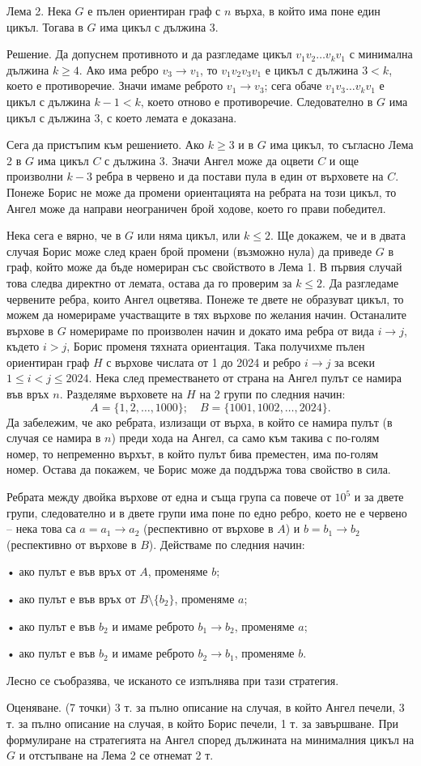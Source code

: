 Лема 2. Нека $G$ е пълен ориентиран граф с $n$ върха, в който има поне един цикъл. Тогава в $G$ има цикъл с дължина 3.

Решение. Да допуснем противното и да разгледаме цикъл $v_1v_2\ldots v_kv_1$ с минимална дължина $k\geq4$. Ако има ребро $v_3\to v_1$, то $v_1v_2v_3v_1$ е цикъл с дължина $3<k$, което е противоречие. Значи имаме реброто $v_1\to v_3$; сега обаче $v_1v_3\ldots v_kv_1$ е цикъл с дължина $k-1<k$, което отново е противоречие. Следователно в $G$ има цикъл с дължина 3, с което лемата е доказана.

Сега да пристъпим към решението. Ако $k\geq3$ и в $G$ има цикъл, то съгласно Лема 2 в $G$ има цикъл $C$ с дължина 3. Значи Ангел може да оцвети $C$ и още произволни $k-3$ ребра в червено и да постави пула в един от върховете на $C$. Понеже Борис не може да промени ориентацията на ребрата на този цикъл, то Ангел може да направи неограничен брой ходове, което го прави победител.

Нека сега е вярно, че в $G$ или няма цикъл, или $k\leq2$. Ще докажем, че и в двата случая Борис може след краен брой промени (възможно нула) да приведе $G$ в граф, който може да бъде номериран със свойството в Лема 1. В първия случай това следва директно от лемата, остава да го проверим за $k\leq2$. Да разгледаме червените ребра, които Ангел оцветява. Понеже те двете не образуват цикъл, то можем да номерираме участващите в тях върхове по желания начин. Останалите върхове в $G$ номерираме по произволен начин и докато има ребра от вида $i\to j$, където $i>j$, Борис променя тяхната ориентация. Така получихме пълен ориентиран граф $H$ с върхове числата от 1 до 2024 и ребро $i\to j$ за всеки $1\leq i<j\leq2024$. Нека след преместването от страна на Ангел пулът се намира във връх $n$. Разделяме върховете на $H$ на 2 групи по следния начин:
$$
A=\{1,2,\ldots,1000\};\quad B=\{1001,1002,\ldots,2024\}.
$$
Да забележим, че ако ребрата, излизащи от върха, в който се намира пулът (в случая се намира в $n$) преди хода на Ангел, са само към такива с по-голям номер, то непременно върхът, в който пулът бива преместен, има по-голям номер. Остава да покажем, че Борис може да поддържа това свойство в сила.

Ребрата между двойка върхове от една и съща група са повече от $10^5$ и за двете групи, следователно и в двете групи има поне по едно ребро, което не е червено – нека това са $a=a_1\to a_2$ (респективно от върхове в $A$) и $b=b_1\to b_2$ (респективно от върхове в $B$). Действаме по следния начин:

• ако пулът е във връх от $A$, променяме $b$;

• ако пулът е във връх от $B\setminus\{b_2\}$, променяме $a$;

• ако пулът е във $b_2$ и имаме реброто $b_1\to b_2$, променяме $a$;

• ако пулът е във $b_2$ и имаме реброто $b_2\to b_1$, променяме $b$.

Лесно се съобразява, че исканото се изпълнява при тази стратегия.

Оценяване. (7 точки) 3 т. за пълно описание на случая, в който Ангел печели, 3 т. за пълно описание на случая, в който Борис печели, 1 т. за завършване. При формулиране на стратегията на Ангел според дължината на минималния цикъл на $G$ и отстъпване на Лема 2 се отнемат 2 т.
